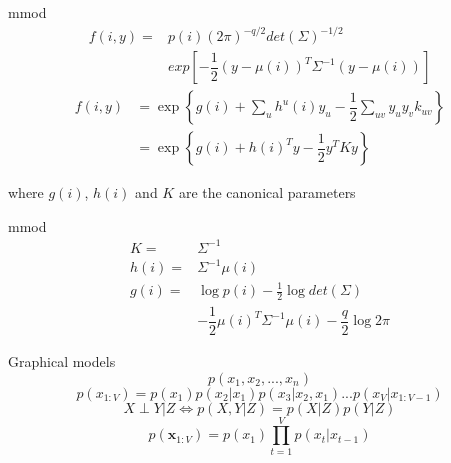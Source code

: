 \documentclass{beamer}
\begin{document}
\begin{frame}{mmod}
\begin{equation}
\begin{split}
f(i,y)=& p(i)(2\pi)^{-q/2}det(\Sigma)^{-1/2} \\
& exp\left[-\dfrac{1}{2}\left(y-\mu(i)\right)^{T}\Sigma^{-1}\left(y-\mu(i)\right)\right]
\end{split}
\label{gaussMix}
\end{equation}
\begin{equation}
\begin{split}
f(i,y) & = \exp\left\lbrace g(i)+\sum_{u}h^{u}(i)y_{u}-\dfrac{1}{2}\sum_{uv} y_{u}y_{v}k_{uv}\right\rbrace \\
&= \exp\left\lbrace g(i)+h(i)^{T}y-\dfrac{1}{2}y^{T}Ky \right\rbrace
\end{split}
\end{equation}

\begin{center}
where $g(i)$, $h(i)$ and $K$ are the canonical parameters
\end{center}

\end{frame}
\begin{frame}{mmod}
\begin{equation}
\begin{split}
K=&\Sigma^{-1} \\
h(i)=&\Sigma^{-1}\mu(i) \\
g(i)=&\log p(i) -\frac{1}{2}\log det (\Sigma) \\
&-\dfrac{1}{2}\mu(i)^{T}\Sigma^{-1}\mu(i)-\dfrac{q}{2}\log 2\pi
\end{split}
\end{equation}
\end{frame}


\begin{frame}{Graphical models}
\begin{equation}
p(x_{1},x_{2},...,x_{n})
\end{equation}
\begin{equation}
p(x_{1:V})=p(x_{1})p(x_{2}|x_{1})p(x_{3}|x_{2},x_{1})...p(x_{V}|x_{1:V-1})
\end{equation}
\begin{equation}
X  \perp Y| Z \iff  p(X,Y|Z) = p(X|Z)p(Y|Z)
\end{equation}
\begin{equation}
p(\textbf{x}_{1:V})=p(x_{1})\prod^{V}_{t=1}p(x_{t}|x_{t-1})
\end{equation}
\end{frame}
\end{document}
